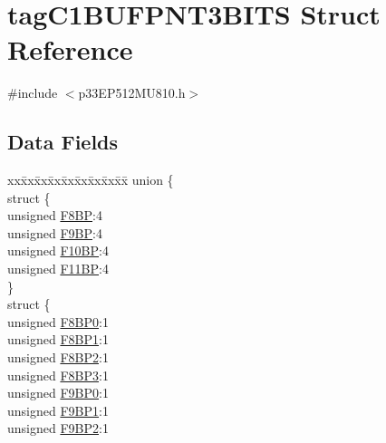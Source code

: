\hypertarget{structtag_c1_b_u_f_p_n_t3_b_i_t_s}{}\section{tag\+C1\+B\+U\+F\+P\+N\+T3\+B\+I\+TS Struct Reference}
\label{structtag_c1_b_u_f_p_n_t3_b_i_t_s}


{\ttfamily \#include $<$p33\+E\+P512\+M\+U810.\+h$>$}

\subsection*{Data Fields}
\begin{DoxyCompactItemize}
\item 
\begin{tabbing}
xx\=xx\=xx\=xx\=xx\=xx\=xx\=xx\=xx\=\kill
union \{\\
\>struct \{\\
\>\>unsigned \hyperlink{structtag_c1_b_u_f_p_n_t3_b_i_t_s_af4086cb1b890f03da4e717ef304e2540}{F8BP}:4\\
\>\>unsigned \hyperlink{structtag_c1_b_u_f_p_n_t3_b_i_t_s_a64bb36c91a03bc2da73f3aa0c797f219}{F9BP}:4\\
\>\>unsigned \hyperlink{structtag_c1_b_u_f_p_n_t3_b_i_t_s_a8bdc64f4989f9853a8ea76af62a101ad}{F10BP}:4\\
\>\>unsigned \hyperlink{structtag_c1_b_u_f_p_n_t3_b_i_t_s_a583229d93c200f27fcff75a594acbf7f}{F11BP}:4\\
\>\} \\
\>struct \{\\
\>\>unsigned \hyperlink{structtag_c1_b_u_f_p_n_t3_b_i_t_s_a5cdccefe53f6f81f663620e6c072cc4c}{F8BP0}:1\\
\>\>unsigned \hyperlink{structtag_c1_b_u_f_p_n_t3_b_i_t_s_a3b299850601bca0f0498a83ac5e03d7e}{F8BP1}:1\\
\>\>unsigned \hyperlink{structtag_c1_b_u_f_p_n_t3_b_i_t_s_a461d5984d098d6c8d0de00e5d34232b2}{F8BP2}:1\\
\>\>unsigned \hyperlink{structtag_c1_b_u_f_p_n_t3_b_i_t_s_aa89d0c341c2e691b6f729f79add89f92}{F8BP3}:1\\
\>\>unsigned \hyperlink{structtag_c1_b_u_f_p_n_t3_b_i_t_s_a3aabcc4b7c6da5a6b42d053651d680de}{F9BP0}:1\\
\>\>unsigned \hyperlink{structtag_c1_b_u_f_p_n_t3_b_i_t_s_aaff95f6b27c6f5c574a3a63e9b29bacc}{F9BP1}:1\\
\>\>unsigned \hyperlink{structtag_c1_b_u_f_p_n_t3_b_i_t_s_a5c10af0ab5f0f9eb1e07746455e5987b}{F9BP2}:1\\

\end{tabbing}
\end{DoxyCompactItemize}
